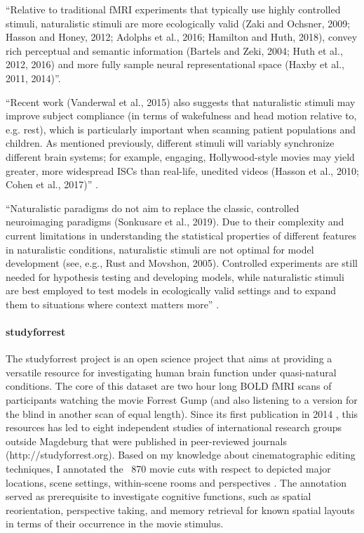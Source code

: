 ``Relative to traditional fMRI experiments that typically use highly controlled
stimuli, naturalistic stimuli are more ecologically valid (Zaki and Ochsner,
2009; Hasson and Honey, 2012; Adolphs et al., 2016; Hamilton and Huth, 2018),
convey rich perceptual and semantic information (Bartels and Zeki, 2004; Huth et
al., 2012, 2016) and more fully sample neural representational space (Haxby et
al., 2011, 2014)''\citep{nastase2019measuring}.

``Recent work (Vanderwal et al., 2015) also suggests that naturalistic stimuli
may improve subject compliance (in terms of wakefulness and head motion relative
to, e.g. rest), which is particularly important when scanning patient
populations and children. As mentioned previously, different stimuli will
variably synchronize different brain systems; for example, engaging,
Hollywood-style movies may yield greater, more widespread ISCs than real-life,
unedited videos (Hasson et al., 2010; Cohen et al., 2017)''
\citep{nastase2019measuring}.

``Naturalistic paradigms do not aim to replace the classic, controlled
neuroimaging paradigms (Sonkusare et al., 2019). Due to their complexity and
current limitations in understanding the statistical properties of different
features in naturalistic conditions, naturalistic stimuli are not optimal for
model development (see, e.g., Rust and Movshon, 2005). Controlled experiments
are still needed for hypothesis testing and developing models, while
naturalistic stimuli are best employed to test models in ecologically valid
settings and to expand them to situations where context matters
more'' \citep{saarimaki2021naturalistic}.



\paragraph{studyforrest}
%
The studyforrest project is an open science project that aims at providing a
versatile resource for investigating human brain function under quasi-natural
conditions.
%
The core of this dataset are two hour long BOLD fMRI scans of participants
watching the movie Forrest Gump (and also listening to a version for the blind
in another scan of equal length).
%
Since its first publication in 2014 \citep{hanke2014audiomovie}, this resources
has led to eight independent studies of international research groups outside
Magdeburg that were published in peer-reviewed journals
(http://studyforrest.org).
%
Based on my knowledge about cinematographic editing techniques, I annotated the
~870 movie cuts with respect to depicted major locations, scene settings,
within-scene rooms and perspectives \citep{haeusler2016cutanno}.
%
The annotation served as prerequisite to investigate cognitive functions, such
as spatial reorientation, perspective taking, and memory retrieval for known
spatial layouts in terms of their occurrence in the movie stimulus.

